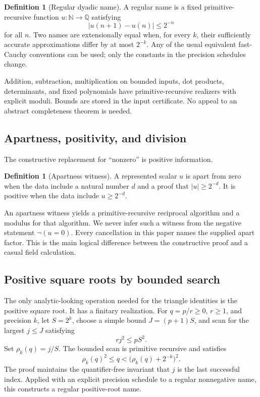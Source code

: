 \documentclass[11pt,letterpaper]{article}
\theoremstyle{definition}
\newtheorem{definition}[theorem]{Definition}
\theoremstyle{remark}
\newcommand{\N}{\mathbb N}
\newcommand{\Q}{\mathbb Q}
\begin{document}
\begin{definition}[Regular dyadic name]
A regular name is a fixed primitive-recursive function \(u:\N\to\Q\) satisfying
\[
  |u(n+1)-u(n)|\le 2^{-n}
\]
for all \(n\).  Two names are extensionally equal when, for every \(k\), their
sufficiently accurate approximations differ by at most \(2^{-k}\).  Any of the
usual equivalent fast-Cauchy conventions can be used; only the constants in the
precision schedules change.
\end{definition}

Addition, subtraction, multiplication on bounded inputs, dot products,
determinants, and fixed polynomials have primitive-recursive realizers with
explicit moduli.  Bounds are stored in the input certificate.  No appeal to an
abstract completeness theorem is needed.

\subsection{Apartness, positivity, and division}

The constructive replacement for ``nonzero'' is positive information.

\begin{definition}[Apartness witness]
A represented scalar \(u\) is apart from zero when the data include a natural
number \(d\) and a proof that \(|u|\ge2^{-d}\).  It is positive when the data
include \(u\ge2^{-d}\).
\end{definition}

An apartness witness yields a primitive-recursive reciprocal algorithm and a
modulus for that algorithm.  We never infer such a witness from the negative
statement \(\neg(u=0)\).  Every cancellation in this paper names the supplied
apart factor.  This is the main logical difference between the constructive
proof and a casual field calculation.

\subsection{Positive square roots by bounded search}

The only analytic-looking operation needed for the triangle identities is the
positive square root.  It has a finitary realization.  For
\(q=p/r\ge0\), \(r\ge1\), and precision \(k\), let \(S=2^k\), choose a simple
bound \(J=(p+1)S\), and scan for the largest \(j\le J\) satisfying
\[
  rj^2\le pS^2.
\]
Set \(\rho_k(q)=j/S\).  The bounded scan is primitive recursive and satisfies
\[
 \rho_k(q)^2\le q<\bigl(\rho_k(q)+2^{-k}\bigr)^2.
 \tag{1.1}\label{eq:root-bracket}
\]
The proof maintains the quantifier-free invariant that \(j\) is the last
successful index.  Applied with an explicit precision schedule to a regular
nonnegative name, this constructs a regular positive-root name.
\end{document}
